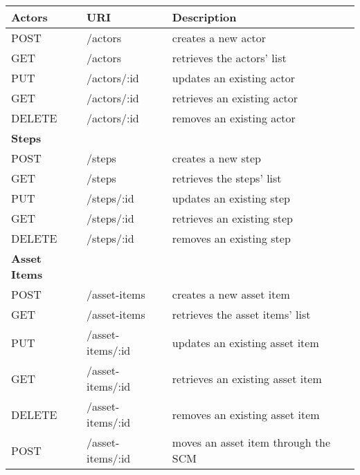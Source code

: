 \begin{table*}[ht]
\centering
\label{table:endpoints}
    \begin{center}
    \begin{tabular}{|l|p{4.5cm}|p{7.664cm}|}
        \hline 
        \cellcolor{cyan}\textbf{Actors}  & \cellcolor{cyan}\textbf{URI} & \cellcolor{cyan}\textbf{Description} \\
        \hline 
        POST & /actors & creates a new actor\\
        \hline 
        GET & /actors & retrieves the actors' list\\
        \hline 
        PUT & /actors/:id & updates an existing actor\\
        \hline 
        GET & /actors/:id & retrieves an existing actor\\
        \hline 
        DELETE & /actors/:id & removes an existing actor\\
        \hline 
        \cellcolor{cyan}\textbf{Steps}  & \cellcolor{cyan}\textbf{} & \cellcolor{cyan}\textbf{} \\
        \hline 
        POST & /steps & creates a new step\\
        \hline 
        GET & /steps & retrieves the steps' list\\
        \hline 
        PUT & /steps/:id & updates an existing step\\
        \hline 
        GET & /steps/:id & retrieves an existing step\\
        \hline 
        DELETE & /steps/:id & removes an existing step\\
        \hline 
        \cellcolor{cyan}\textbf{Asset Items}  & \cellcolor{cyan}\textbf{} & \cellcolor{cyan}\textbf{} \\
        \hline 
        POST & /asset-items & creates a new asset item\\
        \hline 
        GET & /asset-items & retrieves the asset items' list\\
        \hline 
        PUT & /asset-items/:id & updates an existing asset item\\
        \hline 
        GET & /asset-items/:id & retrieves an existing asset item\\
        \hline 
        DELETE & /asset-items/:id & removes an existing asset item\\
        \hline 
        POST & /asset-items/:id & moves an asset item through the SCM\\

\end{tabular}
\end{center}
\end{table*}
